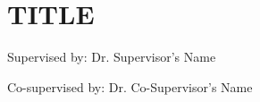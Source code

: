 \section{TITLE}
\begin{frame}
  \titlepage
  \begin{center}
    Supervised by: 
    Dr. Supervisor's Name 
    
    Co-supervised by: 
    Dr. Co-Supervisor's Name 
  \end{center}
\end{frame}